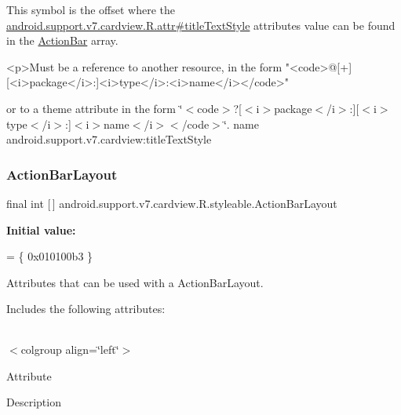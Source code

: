 This symbol is the offset where the \hyperlink{classandroid_1_1support_1_1v7_1_1cardview_1_1R_1_1attr_a51262633643c8f1e23f18798bc06f662}{android.\+support.\+v7.\+cardview.\+R.\+attr\#title\+Text\+Style} attribute\textquotesingle{}s value can be found in the \hyperlink{classandroid_1_1support_1_1v7_1_1cardview_1_1R_1_1styleable_a0cbf7f776e31f78bb0a2b558daf176f8}{Action\+Bar} array.

\begin{DoxyVerb}      <p>Must be a reference to another resource, in the form "<code>@[+][<i>package</i>:]<i>type</i>:<i>name</i></code>"
\end{DoxyVerb}
 or to a theme attribute in the form \char`\"{}$<$code$>$?\mbox{[}$<$i$>$package$<$/i$>$\+:\mbox{]}\mbox{[}$<$i$>$type$<$/i$>$\+:\mbox{]}$<$i$>$name$<$/i$>$$<$/code$>$\char`\"{}.  name android.\+support.\+v7.\+cardview\+:title\+Text\+Style \mbox{\label{classandroid_1_1support_1_1v7_1_1cardview_1_1R_1_1styleable_a63df54faca8a3924c3dfcd3c1af2fd65}} 
\subsubsection{\texorpdfstring{Action\+Bar\+Layout}{ActionBarLayout}}
{\footnotesize\ttfamily final int \mbox{[}$\,$\mbox{]} android.\+support.\+v7.\+cardview.\+R.\+styleable.\+Action\+Bar\+Layout\hspace{0.3cm}{\ttfamily [static]}}

{\bfseries Initial value\+:}
\begin{DoxyCode}
= \{
            0x010100b3
        \}
\end{DoxyCode}
Attributes that can be used with a Action\+Bar\+Layout. 

Includes the following attributes\+:

\tabulinesep=1mm
\begin{longtabu} spread 0pt [c]{*{0}{|X[-1]}|}
\hline
\end{longtabu}
$<$colgroup align=\char`\"{}left\char`\"{}$>$ 

Attribute

Description 

